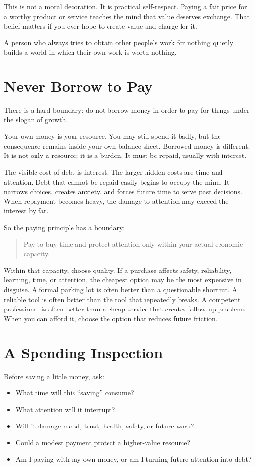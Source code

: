 This is not a moral decoration. It is practical self-respect. Paying a fair price for a worthy product or service teaches the mind that value deserves exchange. That belief matters if you ever hope to create value and charge for it.

A person who always tries to obtain other people's work for nothing quietly builds a world in which their own work is worth nothing.

\section*{Never Borrow to Pay}

There is a hard boundary: do not borrow money in order to pay for things under the slogan of growth.

Your own money is your resource. You may still spend it badly, but the consequence remains inside your own balance sheet. Borrowed money is different. It is not only a resource; it is a burden. It must be repaid, usually with interest.

The visible cost of debt is interest. The larger hidden costs are time and attention. Debt that cannot be repaid easily begins to occupy the mind. It narrows choices, creates anxiety, and forces future time to serve past decisions. When repayment becomes heavy, the damage to attention may exceed the interest by far.

So the paying principle has a boundary:

\begin{quote}
Pay to buy time and protect attention only within your actual economic capacity.
\end{quote}

Within that capacity, choose quality. If a purchase affects safety, reliability, learning, time, or attention, the cheapest option may be the most expensive in disguise. A formal parking lot is often better than a questionable shortcut. A reliable tool is often better than the tool that repeatedly breaks. A competent professional is often better than a cheap service that creates follow-up problems. When you can afford it, choose the option that reduces future friction.

\section*{A Spending Inspection}

Before saving a little money, ask:

\begin{itemize}
\item What time will this ``saving'' consume?
\item What attention will it interrupt?
\item Will it damage mood, trust, health, safety, or future work?
\item Could a modest payment protect a higher-value resource?
\item Am I paying with my own money, or am I turning future attention into debt?
\end{itemize}

